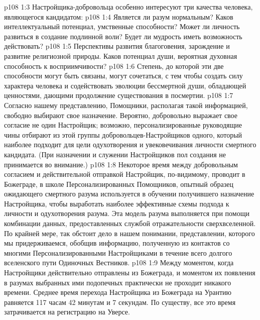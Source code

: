 \vs p108 1:3 Настройщика\hyp{}добровольца особенно интересуют три качества человека, являющегося кандидатом:
\vs p108 1:4 \bibnobreakspace {} Является ли разум нормальным? Каков интеллектуальный потенциал, умственные способности? Может ли личность развиться в создание подлинной воли? Будет ли мудрость иметь возможность действовать?
\vs p108 1:5 \pc {}\bibnobreakspace {} Перспективы развития благоговения, зарождение и развитие религиозной природы. Каков потенциал души, вероятная духовная способность к восприимчивости?
\vs p108 1:6 \pc {}\bibnobreakspace {} Степень, до которой эти две способности могут быть связаны, могут сочетаться, с тем чтобы создать силу характера человека и содействовать эволюции бессмертной души, обладающей ценностями, дающими продолжение существования в посмертии.
\vs p108 1:7 \pc Согласно нашему представлению, Помощники, располагая такой информацией, свободно выбирают свое назначение. Вероятно, добровольно выражает свое согласие не один Настройщик; возможно, персонализированные руководящие чины отбирают из этой группы добровольцев\hyp{}Настройщиков одного, который наиболее подходит для цели одухотворения и увековечивания личности смертного кандидата. (При назначении и служении Настройщиков пол создания не принимается во внимание.)
\vs p108 1:8 Некоторое время между добровольным согласием и действительной отправкой Настройщик, по\hyp{}видимому, проводит в Божеграде, в школе Персонализированных Помощников, опытный образец ожидающего смертного разума используется в обучении получившего назначение Настройщика, чтобы выработать наиболее эффективные схемы подхода к личности и одухотворения разума. Эта модель разума выполняется при помощи комбинации данных, предоставленных службой отражательности сверхвселенной. По крайней мере, так обстоит дело в нашем понимании, представлении, которого мы придерживаемся, обобщив информацию, полученную из контактов со многими Персонализированными Настройщиками в течение всего долгого вселенского пути Одиночных Вестников.
\vs p108 1:9 Между моментом, когда Настройщики действительно отправлены из Божеграда, и моментом их появления в разумах выбранных ими подопечных практически не проходит никакого времени. Среднее время перехода Настройщика из Божеграда на Урантию равняется 117 часам 42 минутам и 7 секундам. По существу, все это время затрачивается на регистрацию на Уверсе.
